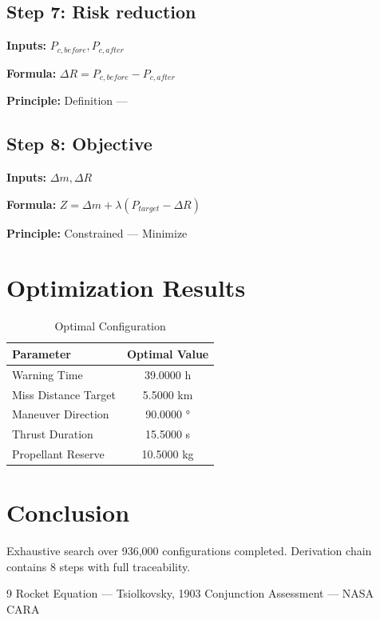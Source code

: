 \documentclass[11pt,twocolumn]{article}
\begin{document}
\subsection*{Step 7: Risk reduction}
\textbf{Inputs:} $P_{c,before}, P_{c,after}$

\textbf{Formula:} $\Delta R = P_{c,before} - P_{c,after}$

\textbf{Principle:} Definition --- 

\subsection*{Step 8: Objective}
\textbf{Inputs:} $\Delta m, \Delta R$

\textbf{Formula:} $Z = \Delta m + \lambda(P_{target} - \Delta R)$

\textbf{Principle:} Constrained --- Minimize


\section{Optimization Results}
\begin{table}[h]
\centering
\caption{Optimal Configuration}
\begin{tabular}{@{}lc@{}}
\toprule
Parameter & Optimal Value \\
\midrule
Warning Time & 39.0000 h \\
Miss Distance Target & 5.5000 km \\
Maneuver Direction & 90.0000 ° \\
Thrust Duration & 15.5000 s \\
Propellant Reserve & 10.5000 kg \\
\bottomrule
\end{tabular}
\end{table}

\section{Conclusion}
Exhaustive search over 936,000 configurations completed.
Derivation chain contains 8 steps with full traceability.

\begin{thebibliography}{9}
 Rocket Equation --- Tsiolkovsky, 1903
 Conjunction Assessment --- NASA CARA
\end{thebibliography}
\end{document}
